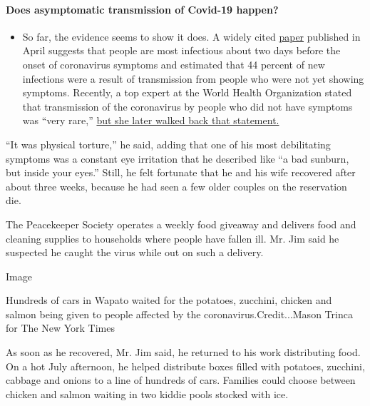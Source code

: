 \begin{itemize}
{  \paragraph{Does asymptomatic transmission of Covid-19
  happen?}\label{does-asymptomatic-transmission-of-covid-19-happen}}

  \begin{itemize}
  \tightlist
  \item
    So far, the evidence seems to show it does. A widely cited
    \href{https://www.nature.com/articles/s41591-020-0869-5}{paper}
    published in April suggests that people are most infectious about
    two days before the onset of coronavirus symptoms and estimated that
    44 percent of new infections were a result of transmission from
    people who were not yet showing symptoms. Recently, a top expert at
    the World Health Organization stated that transmission of the
    coronavirus by people who did not have symptoms was ``very rare,''
    \href{https://www.nytimes.com/2020/06/09/world/coronavirus-updates.html?action=click\&pgtype=Article\&state=default\&region=MAIN_CONTENT_3\&context=storylines_faq\#link-1f302e21}{but
    she later walked back that statement.}
  \end{itemize}
\end{itemize}

``It was physical torture,'' he said, adding that one of his most
debilitating symptoms was a constant eye irritation that he described
like ``a bad sunburn, but inside your eyes.'' Still, he felt fortunate
that he and his wife recovered after about three weeks, because he had
seen a few older couples on the reservation die.

The Peacekeeper Society operates a weekly food giveaway and delivers
food and cleaning supplies to households where people have fallen ill.
Mr. Jim said he suspected he caught the virus while out on such a
delivery.

Image

Hundreds of cars in Wapato waited for the potatoes, zucchini, chicken
and salmon being given to people affected by the
coronavirus.Credit...Mason Trinca for The New York Times

As soon as he recovered, Mr. Jim said, he returned to his work
distributing food. On a hot July afternoon, he helped distribute boxes
filled with potatoes, zucchini, cabbage and onions to a line of hundreds
of cars. Families could choose between chicken and salmon waiting in two
kiddie pools stocked with ice.

